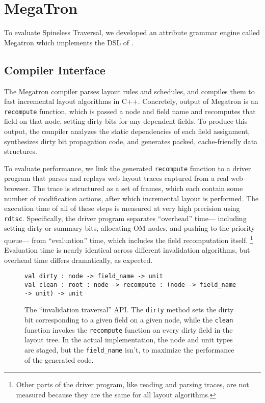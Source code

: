 \section{MegaTron}

To evaluate Spineless Traversal,
  we developed an attribute grammar engine called Megatron
  which implements the DSL of .

\subsection{Compiler Interface}
\label{sec:compiler}

The Megatron compiler
  parses layout rules and schedules,
  and compiles them to fast incremental layout algorithms in C++.
Concretely, output of Megatron is an \texttt{recompute} function,
  which is passed a node and field name
  and recomputes that field on that node,
  setting dirty bits for any dependent fields.
To produce this output, the compiler
  analyzes the static dependencies of each field assignment,
  synthesizes dirty bit propagation code,
  and generates packed, cache-friendly data structures.

To evaluate performance,
  we link the generated \texttt{recompute} function
  to a driver program that parses and replays web layout traces
  captured from a real web browser.
The trace is structured as a set of frames,
  which each contain some number of modification actions,
  after which incremental layout is performed.
The execution time of all of these steps is measured
  at very high precision using \texttt{rdtsc}.
Specifically, the driver program
  separates ``overhead'' time---%
  including setting dirty or summary bits,
  allocating OM nodes, and pushing to the priority queue---%
  from ``evaluation'' time,
  which includes the field recomputation itself.%
\footnote{
  Other parts of the driver program,
    like reading and parsing traces, are not measured
    because they are the same for all layout algorithms.}
Evaluation time is nearly identical
  across different invalidation algorithms,
  but overhead time differs dramatically, as expected.

\begin{figure}[tbp]
\begin{verbatim}
val dirty : node -> field_name -> unit
val clean : root : node -> recompute : (node -> field_name -> unit) -> unit
\end{verbatim}
\caption{
  The ``invalidation traversal'' API.
  The \texttt{dirty} method sets the dirty bit
    corresponding to a given field on a given node,
    while the \texttt{clean} function
    invokes the \texttt{recompute} function
    on every dirty field in the layout tree.
  In the actual implementation,
    the node and unit types are staged,
    but the \texttt{field_name} isn't,
    to maximize the performance of the generated code.}
\label{fig:traversal-api}
\end{figure}

